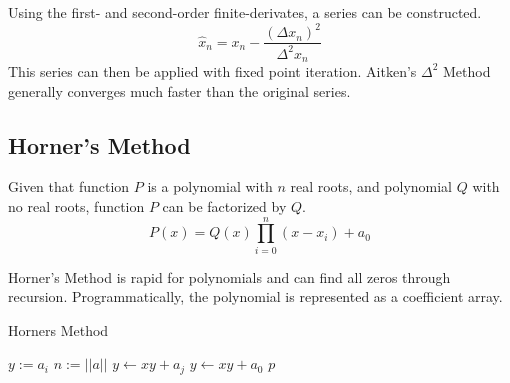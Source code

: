 \documentclass[12pt]{article}
\numberwithin{equation}{subsection}
\begin{document}
            Using the first- and second-order finite-derivates, a series can be
            constructed.
            $$\hat{x}_n = x_n - \frac{(\Delta x_n)^2}{\Delta^2 x_n}$$
            This series can then be applied with fixed point iteration.
            Aitken's $\Delta^2$ Method generally converges much faster than the original
            series.

        \subsection{Horner's Method}

            Given that function $P$ is a polynomial with $n$ real roots,
            and polynomial $Q$ with no real roots, function $P$ can be
            factorized by $Q$.
            $$P(x) = Q(x) \prod_{i=0}^{n} (x - x_i) + a_0$$

            Horner's Method is rapid for polynomials and can find all zeros
            through recursion. Programmatically, the polynomial is represented
            as a coefficient array.

            \begin{center}
            \begin{algorithm}[H]
                \caption{Horners Method}
                \begin{algorithmic}[1]
                    \State $y := a_i$
                    \State $n := ||a|| $
                        \State $y \gets xy + a_j$
                    \EndFor
                    \State $y \gets xy + a_{0}$
                    \State \Return $p$
                    \EndProcedure
                \end{algorithmic}
            \end{algorithm}
            \end{center}
\end{document}
